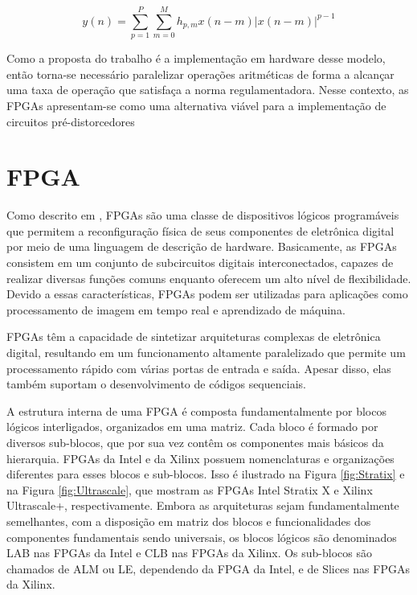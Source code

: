 \begin{equation}
    y(n) = \sum_{p=1}^{P} \sum_{m=0}^{M} h_{p,m} x(n - m) \left| x(n - m) \right|^{p-1}
    \label{eq:mp}
\end{equation}

Como a proposta do trabalho é a implementação em hardware desse modelo, então torna-se necessário paralelizar operações aritméticas de forma a alcançar uma taxa de operação que satisfaça a norma regulamentadora. Nesse contexto, as FPGAs apresentam-se como uma alternativa viável para a implementação de circuitos pré-distorcedores 

\section{FPGA}

Como descrito em \cite{Pedroni2010}, FPGAs são uma classe de dispositivos lógicos programáveis que permitem a reconfiguração física de seus componentes de eletrônica digital por meio de uma linguagem de descrição de hardware. Basicamente, as FPGAs consistem em um conjunto de subcircuitos digitais interconectados, capazes de realizar diversas funções comuns enquanto oferecem um alto nível de flexibilidade. Devido a essas características, FPGAs podem ser utilizadas para aplicações como processamento de imagem em tempo real e aprendizado de máquina.

FPGAs têm a capacidade de sintetizar arquiteturas complexas de eletrônica digital, resultando em um funcionamento altamente paralelizado que permite um processamento rápido com várias portas de entrada e saída. Apesar disso, elas também suportam o desenvolvimento de códigos sequenciais.

A estrutura interna de uma FPGA é composta fundamentalmente por blocos lógicos interligados, organizados em uma matriz. Cada bloco é formado por diversos sub-blocos, que por sua vez contêm os componentes mais básicos da hierarquia. FPGAs da Intel e da Xilinx possuem nomenclaturas e organizações diferentes para esses blocos e sub-blocos. Isso é ilustrado na Figura \ref{fig:Stratix} e na Figura \ref{fig:Ultrascale}, que mostram as FPGAs Intel Stratix X e Xilinx Ultrascale+, respectivamente. Embora as arquiteturas sejam fundamentalmente semelhantes, com a disposição em matriz dos blocos e funcionalidades dos componentes fundamentais sendo universais, os blocos lógicos são denominados LAB nas FPGAs da Intel e CLB nas FPGAs da Xilinx. Os sub-blocos são chamados de ALM ou LE, dependendo da FPGA da Intel, e de Slices nas FPGAs da Xilinx.


